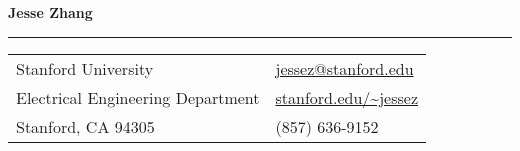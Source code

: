 \documentclass[letterpaper,11pt,oneside]{article}
\begin{document}

\noindent  \LARGE{\textbf{Jesse Zhang}}  \\
\vspace{-2ex}
\hrule
\normalsize


\begin{center}
\begin{tabular}{l l}
 Stanford University    & \hspace{1in} \href{mailto:jessez@stanford.edu}{\url{jessez@stanford.edu}} \\
 Electrical Engineering Department    & \hspace{1in} {\url{stanford.edu/~jessez}}   \\
 Stanford, CA 94305 & \hspace{1in} (857) 636-9152 \\
\end{tabular}
\end{center}


\end{document}

